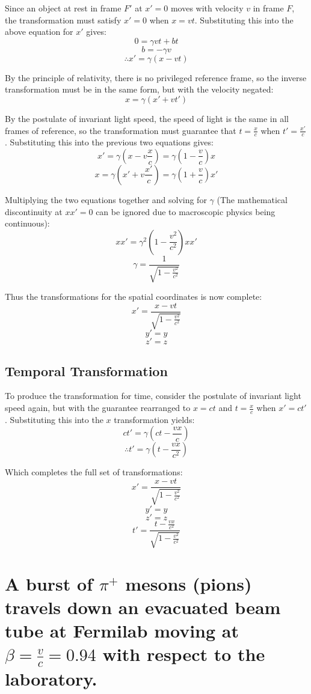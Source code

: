 \documentclass[a4paper]{scrartcl}
\begin{document}
Since an object at rest in frame \(F'\) at \(x' = 0\) moves with velocity \(v\) in frame \(F\), the transformation must satisfy \(x' = 0\) when \(x = v t\). Substituting this into the above equation for \(x'\) gives:
\[0 = \gamma v t + b t\]
\[b = -\gamma v\]
\[\therefore x' = \gamma (x - v t)\]

By the principle of relativity, there is no privileged reference frame, so the inverse transformation must be in the same form, but with the velocity negated:
\[x = \gamma (x' + v t')\]

By the postulate of invariant light speed, the speed of light is the same in all frames of reference, so the transformation must guarantee that \(t = \frac{x}{c}\) when \(t' = \frac{x'}{c}\). Substituting this into the previous two equations gives:
\[x' = \gamma (x - v \frac{x}{c}) = \gamma (1 - \frac{v}{c}) x\]
\[x = \gamma (x' + v \frac{x'}{c}) = \gamma (1 + \frac{v}{c}) x'\]

Multiplying the two equations together and solving for \(\gamma\) (The mathematical discontinuity at \(x x' = 0\) can be ignored due to macroscopic physics being continuous):
\[x x' = \gamma^2 (1 - \frac{v^2}{c^2}) x x'\]
\[\gamma = \frac{1}{\sqrt{1 - \frac{v^2}{c^2}}}\]

Thus the transformations for the spatial coordinates is now complete:
\[x' = \frac{x - v t}{\sqrt{1 - \frac{v^2}{c^2}}}\]
\[y' = y\]
\[z' = z\]

\subsection{Temporal Transformation}
To produce the transformation for time, consider the postulate of invariant light speed again, but with the guarantee rearranged to \(x = c t\) and \(t = \frac{x}{c}\) when \(x' = c t'\). Substituting this into the \(x\) transformation yields:
\[c t' = \gamma (c t - \frac{v x}{c})\]
\[\therefore t' = \gamma (t - \frac{v x}{c^2})\]

Which completes the full set of transformations:
\[x' = \frac{x - v t}{\sqrt{1 - \frac{v^2}{c^2}}}\]
\[y' = y\]
\[z' = z\]
\[t' = \frac{t - \frac{v x}{c^2}}{\sqrt{1 - \frac{v^2}{c^2}}}\]

\section{A burst of \(\pi^+\) mesons (pions) travels down an evacuated beam tube at Fermilab moving at \(\beta = \frac{v}{c} = 0.94\) with respect to the laboratory.}
\end{document}
